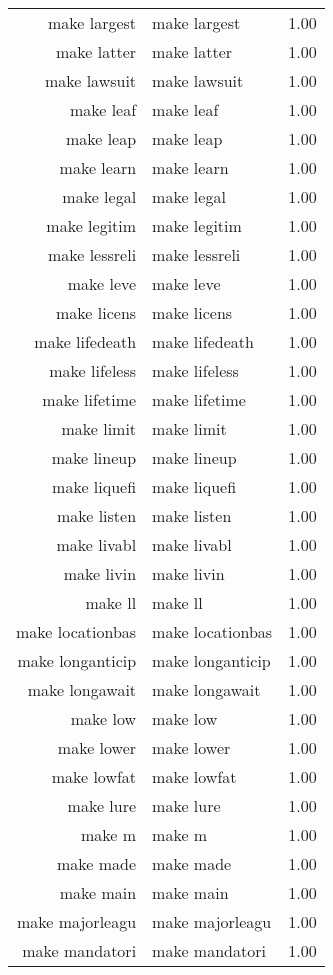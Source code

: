\begin{table}[ht]
\begin{tabular}{rlr}
  make largest & make largest & 1.00 \\ 
  make latter & make latter & 1.00 \\ 
  make lawsuit & make lawsuit & 1.00 \\ 
  make leaf & make leaf & 1.00 \\ 
  make leap & make leap & 1.00 \\ 
  make learn & make learn & 1.00 \\ 
  make legal & make legal & 1.00 \\ 
  make legitim & make legitim & 1.00 \\ 
  make lessreli & make lessreli & 1.00 \\ 
  make leve & make leve & 1.00 \\ 
  make licens & make licens & 1.00 \\ 
  make lifedeath & make lifedeath & 1.00 \\ 
  make lifeless & make lifeless & 1.00 \\ 
  make lifetime & make lifetime & 1.00 \\ 
  make limit & make limit & 1.00 \\ 
  make lineup & make lineup & 1.00 \\ 
  make liquefi & make liquefi & 1.00 \\ 
  make listen & make listen & 1.00 \\ 
  make livabl & make livabl & 1.00 \\ 
  make livin & make livin & 1.00 \\ 
  make ll & make ll & 1.00 \\ 
  make locationbas & make locationbas & 1.00 \\ 
  make longanticip & make longanticip & 1.00 \\ 
  make longawait & make longawait & 1.00 \\ 
  make low & make low & 1.00 \\ 
  make lower & make lower & 1.00 \\ 
  make lowfat & make lowfat & 1.00 \\ 
  make lure & make lure & 1.00 \\ 
  make m & make m & 1.00 \\ 
  make made & make made & 1.00 \\ 
  make main & make main & 1.00 \\ 
  make majorleagu & make majorleagu & 1.00 \\ 
  make mandatori & make mandatori & 1.00 \\ 

\end{tabular}
\end{table}
